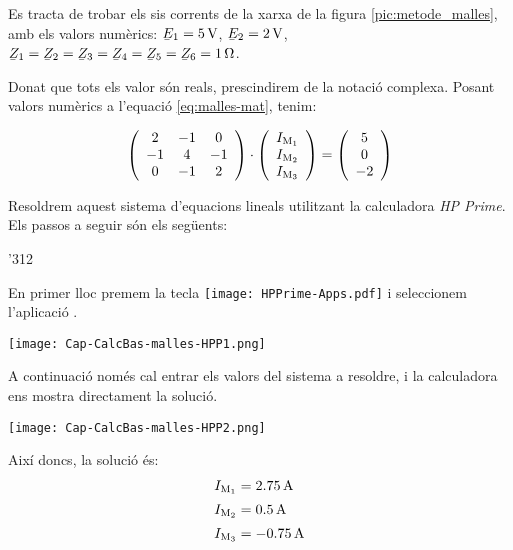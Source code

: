 \begin{exemple}\label{ex:malles}
    Es tracta de trobar els sis corrents de la xarxa de la figura \vref{pic:metode_malles}, amb els valors numèrics: $\cmplx{E}_1=\SI{5}{V}$, $\cmplx{E}_2=\SI{2}{V}$, $\cmplx{Z}_1=\cmplx{Z}_2=\cmplx{Z}_3=\cmplx{Z}_4=\cmplx{Z}_5=\cmplx{Z}_6=\SI{1}{\ohm}$.

    Donat que tots els valor són reals, prescindirem de la notació complexa. Posant valors numèrics a l'equació \eqref{eq:malles-mat}, tenim:

    \[
      \left(
        \begin{array}{ccc}
          2 & -1 &  0 \\
         -1 &  4 & -1 \\
          0 &  -1 & 2 \\
        \end{array}
      \right)
      \cdot
      \left(
          \begin{array}{c}
            I_\mathrm{M_1} \\
            I_\mathrm{M_2} \\
            I_\mathrm{M_3} \\
          \end{array}
      \right)
      =
      \left(
          \begin{array}{c}
            5 \\
            0 \\
            -2 \\
          \end{array}
      \right)
    \]

    Resoldrem aquest sistema d'equacions lineals utilitzant la calculadora \emph{HP Prime}. Els passos a seguir són els següents:

    \begin{dingautolist}{'312}
     \item En primer lloc premem la tecla \texttt{[image: HPPrime-Apps.pdf]} i seleccionem l'aplicació .

         \texttt{[image: Cap-CalcBas-malles-HPP1.png]}
    \item A continuació només cal entrar els valors del sistema a resoldre, i la calculadora ens mostra directament la solució.

         \texttt{[image: Cap-CalcBas-malles-HPP2.png]}
    \end{dingautolist}

    Així doncs, la solució és:
    \begin{align*}
        I_\mathrm{M_1} &= \SI{2,75}{A} \\[0.5ex]
        I_\mathrm{M_2} &= \SI{0,5}{A} \\[0.5ex]
        I_\mathrm{M_3} &= \SI{-0,75}{A}
    \end{align*}


\end{exemple}
